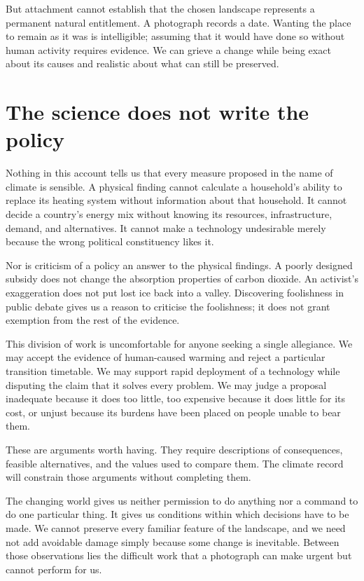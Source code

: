 \documentclass[12pt,a4paper]{book}
\begin{document}
But attachment cannot establish that the chosen landscape represents a permanent natural entitlement. A photograph records a date. Wanting the place to remain as it was is intelligible; assuming that it would have done so without human activity requires evidence. We can grieve a change while being exact about its causes and realistic about what can still be preserved.

\section*{The science does not write the policy}

Nothing in this account tells us that every measure proposed in the name of climate is sensible. A physical finding cannot calculate a household's ability to replace its heating system without information about that household. It cannot decide a country's energy mix without knowing its resources, infrastructure, demand, and alternatives. It cannot make a technology undesirable merely because the wrong political constituency likes it.

Nor is criticism of a policy an answer to the physical findings. A poorly designed subsidy does not change the absorption properties of carbon dioxide. An activist's exaggeration does not put lost ice back into a valley. Discovering foolishness in public debate gives us a reason to criticise the foolishness; it does not grant exemption from the rest of the evidence.

This division of work is uncomfortable for anyone seeking a single allegiance. We may accept the evidence of human-caused warming and reject a particular transition timetable. We may support rapid deployment of a technology while disputing the claim that it solves every problem. We may judge a proposal inadequate because it does too little, too expensive because it does little for its cost, or unjust because its burdens have been placed on people unable to bear them.

These are arguments worth having. They require descriptions of consequences, feasible alternatives, and the values used to compare them. The climate record will constrain those arguments without completing them.

The changing world gives us neither permission to do anything nor a command to do one particular thing. It gives us conditions within which decisions have to be made. We cannot preserve every familiar feature of the landscape, and we need not add avoidable damage simply because some change is inevitable. Between those observations lies the difficult work that a photograph can make urgent but cannot perform for us.
\end{document}
